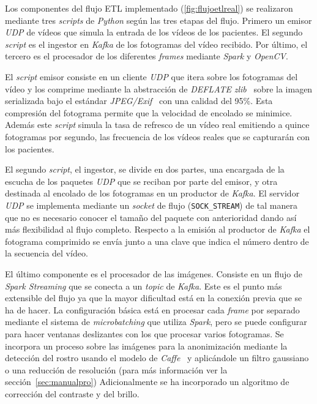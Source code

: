 Los componentes del flujo ETL implementado (\autoref{fig:flujoetlreal}) se realizaron mediante tres \textit{scripts} de \textit{Python} según las tres etapas del flujo. Primero un emisor \textit{UDP} de vídeos que simula la entrada de los vídeos de los pacientes. El segundo \textit{script} es el ingestor en \textit{Kafka} de los fotogramas del vídeo recibido. Por último, el tercero es el procesador de los diferentes \textit{frames} mediante \textit{Spark} y \textit{OpenCV}.

El \textit{script} emisor consiste en un cliente \textit{UDP} que itera sobre los fotogramas del vídeo y los comprime mediante la abstracción de \textit{DEFLATE} \textit{zlib}~\cite{tool:zlib} sobre la imagen serializada bajo el estándar \textit{JPEG/Exif}~\cite{pennebaker1992jpeg} con una calidad del 95\%. Esta compresión del fotograma permite que la velocidad de encolado se minimice. Además este \textit{script} simula la tasa de refresco de un vídeo real emitiendo a quince fotogramas por segundo, las frecuencia de los vídeos reales que se capturarán con los pacientes.

El segundo \textit{script}, el ingestor, se divide en dos partes, una encargada de la escucha de los paquetes \textit{UDP} que se reciban por parte del emisor, y otra destinada al encolado de los fotogramas en un productor de \textit{Kafka}. El servidor \textit{UDP} se implementa  mediante un \textit{socket} de flujo (\texttt{SOCK\_STREAM}) de tal manera que no es necesario conocer el tamaño del paquete con anterioridad dando así más flexibilidad al flujo completo. Respecto a la emisión al productor de \textit{Kafka} el fotograma comprimido se envía junto a una clave que indica el número dentro de la secuencia del vídeo.

El último componente es el procesador de las imágenes. Consiste en un flujo de \textit{Spark Streaming} que se conecta a un \textit{topic} de \textit{Kafka}. Este es el punto más extensible del flujo ya que la mayor dificultad está en la conexión previa que se ha de hacer. La configuración básica está en procesar cada \textit{frame} por separado mediante el sistema de \textit{microbatching} que utiliza \textit{Spark}, pero se puede configurar para hacer ventanas deslizantes con los que procesar varios fotogramas. Se incorpora un proceso sobre las imágenes para la anonimización mediante la detección del rostro usando el modelo de \textit{Caffe}~\cite{jia2014caffe} y aplicándole un filtro gaussiano o una reducción de resolución (para más información ver la sección~\ref{sec:manualpro}) Adicionalmente se ha incorporado un algoritmo de corrección del contraste y del brillo.

